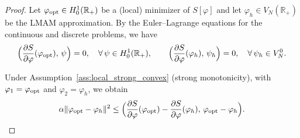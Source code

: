 \documentclass[a4paper,fleqn, 12pt]{cas-sc}
\numberwithin{table}{section}
\begin{document}
\begin{proof}
Let $\varphi_{\rm opt}\in H_0^1(\mathbb{R}_+)$ be a (local) minimizer of $S[\varphi]$ and
let $\varphi_h\in V_N(\mathbb{R}_+)$ be the LMAM approximation.
By the Euler--Lagrange equations for the continuous and discrete problems, we have
\[
\Bigl(\frac{\partial S}{\partial\varphi}(\varphi_{\rm opt}),\,\psi\Bigr)=0,
\quad \forall\,\psi\in H_0^1(\mathbb{R}_+),
\qquad
\Bigl(\frac{\partial S}{\partial\varphi}(\varphi_h),\,\psi_h\Bigr)=0,
\quad \forall\,\psi_h\in V_N^0.
\]

Under Assumption~\ref{ass:local_strong_convex} (strong monotonicity), with
$\varphi_1=\varphi_{\rm opt}$ and $\varphi_2=\varphi_h$, we obtain
\begin{equation}\label{eq:mono_step}
\alpha\|\varphi_{\rm opt}-\varphi_h\|^2
\le
\Bigl(\frac{\partial S}{\partial\varphi}(\varphi_{\rm opt})
-\frac{\partial S}{\partial\varphi}(\varphi_h),\,\varphi_{\rm opt}-\varphi_h\Bigr).
\end{equation}


\end{proof}
\end{document}
